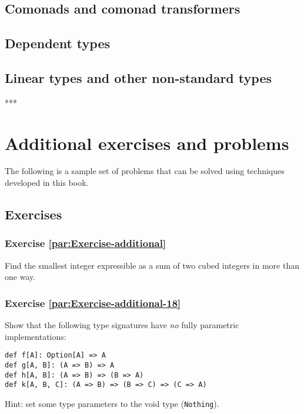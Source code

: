\subsection{Comonads and comonad transformers}

\subsection{Dependent types}

\subsection{Linear types and other non-standard types}

{*}{*}{*}

\section{Additional exercises and problems\label{chap:Exercises-in-AFTT}}

The following is a sample set of problems that can be solved using
techniques developed in this book.

\subsection{Exercises}

\subsubsection{Exercise \label{par:Exercise-additional}\ref{par:Exercise-additional}}

Find the smallest integer expressible as a sum of two cubed integers
in more than one way.

\subsubsection{Exercise \label{par:Exercise-additional-18}\ref{par:Exercise-additional-18}}

Show that the following type signatures have \emph{no} fully parametric
implementations:

\begin{lstlisting}
def f[A]: Option[A] => A
def g[A, B]: (A => B) => A
def h[A, B]: (A => B) => (B => A)
def k[A, B, C]: (A => B) => (B => C) => (C => A)
\end{lstlisting}

Hint: set some type parameters to the void type (\lstinline!Nothing!).

